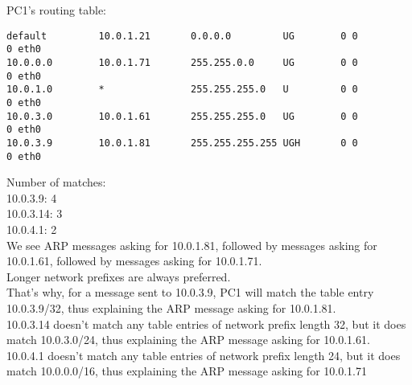 PC1's routing table:
\begin{lstlisting}
default         10.0.1.21       0.0.0.0         UG        0 0          0 eth0
10.0.0.0        10.0.1.71       255.255.0.0     UG        0 0          0 eth0
10.0.1.0        *               255.255.255.0   U         0 0          0 eth0
10.0.3.0        10.0.1.61       255.255.255.0   UG        0 0          0 eth0
10.0.3.9        10.0.1.81       255.255.255.255 UGH       0 0          0 eth0
\end{lstlisting}
Number of matches:\\
10.0.3.9: 4\\
10.0.3.14: 3\\
10.0.4.1: 2\\

We see ARP messages asking for 10.0.1.81, followed by messages asking for 10.0.1.61, followed by messages asking for 10.0.1.71.\\

Longer network prefixes are always preferred. \\
That's why, for a message sent to 10.0.3.9, PC1 will match the table entry 10.0.3.9/32, thus explaining the ARP message asking for 10.0.1.81.\\
10.0.3.14 doesn't match any table entries of network prefix length 32, but it does match 10.0.3.0/24, thus explaining the ARP message asking for 10.0.1.61.\\
10.0.4.1 doesn't match any table entries of network prefix length 24, but it does match 10.0.0.0/16, thus explaining the ARP message asking for 10.0.1.71\\
